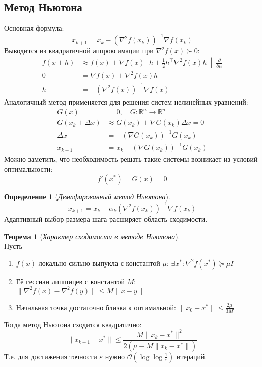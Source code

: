 \documentclass[11pt,a4paper]{report}
\def\eps{\varepsilon}
\def\Real{\mathbb{R}}
\def\le{\leqslant}
\theoremstyle{definition}
\theoremstyle{definition}
\newtheorem{theorem}{Теорема}[section]
\theoremstyle{definition}
\newtheorem*{definition}{Определение}
\begin{document}
	\subsection{Метод Ньютона}
	Основная формула: 
	$$
		x_{k+1} = x_{k} - (\nabla^2 f(x_k))^{-1} \nabla f(x_{k})
	$$
	Выводится из квадратичной аппроксимации при $ \nabla^2 f(x) \succ 0 $:
	\begin{align*}
		f(x + h) &\approx \left. f(x) + \nabla f(x)^{\top} h + \frac{1}{2} h^{\top} \nabla^2 f(x) h\ \middle|\ \frac{\partial}{\partial h} \right.  \\
		0 &= \nabla f(x) + \nabla^2 f(x) h\\
		h &= -(\nabla^2 f(x))^{-1} \nabla f(x)
	\end{align*}
	Аналогичный метод применяется для решения систем нелинейных уравнений:
	\begin{align*}
		G(x) &= 0,\quad G : \Real^{n} \to \Real^{n}\\
		G(x_k + \Delta x) &\approx G(x_k) + \nabla G(x_k) \Delta x = 0\\
		\Delta x &= -(\nabla G(x_k))^{-1} G(x_{k})\\
		x_{k+1} &= x_{k} - (\nabla G(x_k))^{-1} G(x_{k})
	\end{align*}
	Можно заметить, что необходимость решать такие системы возникает из условий оптимальности:
	$$
		f'(x^{*}) = G(x) = 0	
	$$
	\begin{definition}[\textit{Демпфированный метод Ньютона}]
		$$
			x_{k+1} = x_{k} - \alpha_k (\nabla^2 f(x_k))^{-1} \nabla f(x_k)
		$$
		Адаптивный выбор размера шага расширяет область сходимости.
	\end{definition}
	\begin{theorem}[\textit{Характер сходимости в методе Ньютона}]$  $\\
		Пусть 
		\begin{enumerate}
			\item $ f(x) $ локально сильно выпукла с константой $ \mu $: $ \exists x^{*}: \nabla^2 f(x^*) \succeq \mu I $ 
			\item Её гессиан липшицев с константой $ M $: $ \| \nabla^2 f(x) - \nabla^2 f(y) \| \le M \| x - y \| $
			\item Начальная точка достаточно близка к оптимальной: $ \| x_0 - x^* \| \le \frac{2\mu}{3M} $
		\end{enumerate}
		Тогда метод Ньютона сходится квадратично:
		$$
			\| x_{k+1} - x^* \| \le \frac{M \| x_k - x^* \|^2}{2(\mu - M \| x_k - x^* \|)}
		$$
		Т.е. для достижения точности $ \eps $ нужно $ \mathcal{O} \left (\log\log \frac{1}{\eps}\right ) $ итераций.
	\end{theorem}
\end{document}
